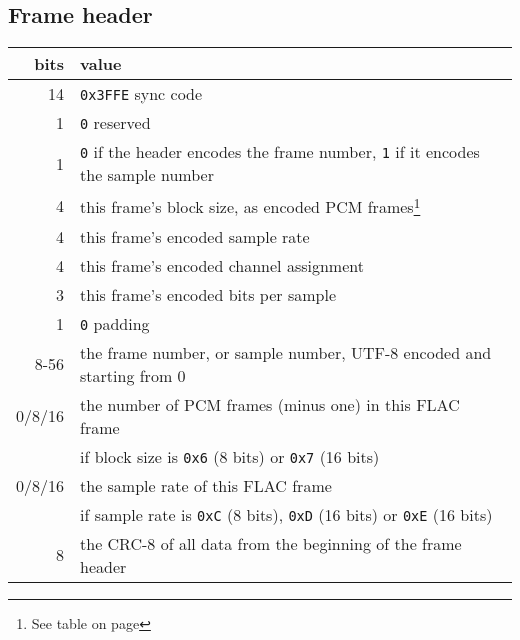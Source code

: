 \subsection{Frame header}
\begin{minipage}{\linewidth}
\renewcommand\thefootnote{\thempfootnote}
\begin{tabular}{|r|l|}
\hline
bits & value \\
\hline
14 & \texttt{0x3FFE} sync code \\
1 & \texttt{0} reserved \\
1 & \texttt{0} if the header encodes the frame number, \texttt{1} if it encodes the sample number \\
4 & this frame's block size, as encoded PCM frames\footnote{See table on page \pageref{flac_encoded_fields} } \\
4 & this frame's encoded sample rate\footnotemark[\value{mpfootnote}] \\
4 & this frame's encoded channel assignment\footnotemark[\value{mpfootnote}] \\
3 & this frame's encoded bits per sample\footnotemark[\value{mpfootnote}] \\
1 & \texttt{0} padding \\
8-56 & the frame number, or sample number, UTF-8 encoded and starting from 0 \\
0/8/16 & the number of PCM frames (minus one) in this FLAC frame \\
& if block size is \texttt{0x6} (8 bits) or \texttt{0x7} (16 bits) \\
0/8/16 & the sample rate of this FLAC frame \\
& if sample rate is \texttt{0xC} (8 bits), \texttt{0xD} (16 bits) or \texttt{0xE} (16 bits) \\
8 & the CRC-8 of all data from the beginning of the frame header \\
\hline
\end{tabular}
\end{minipage}

\vspace{2ex}


